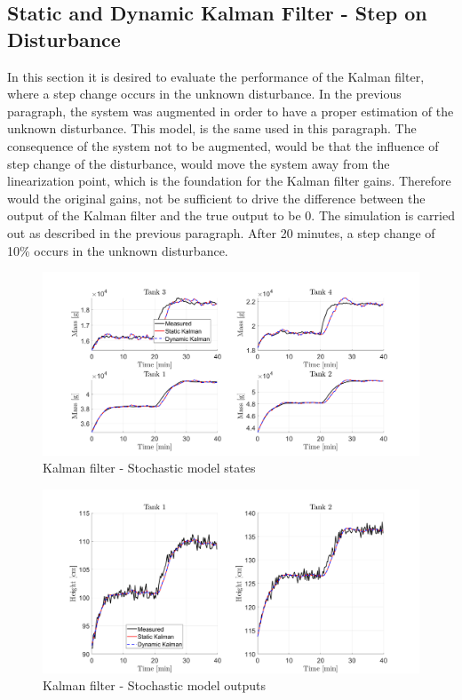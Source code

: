 \subsection{Static and Dynamic Kalman Filter - Step on Disturbance}
In this section it is desired to evaluate the performance of the Kalman filter, where a step change occurs in the unknown disturbance. In the previous paragraph, the system was augmented in order to have a proper estimation of the unknown disturbance. This model, is the same used in this paragraph. The consequence of the system not to be augmented, would be that the influence of step change of the disturbance, would move the system away from the linearization point, which is the foundation for the Kalman filter gains. Therefore would the original gains, not be sufficient to drive the difference between the output of the Kalman filter and the true output to be 0. The simulation is carried out as described in the previous paragraph. After 20 minutes, a step change of 10\% occurs in the unknown disturbance.
\begin{figure}[H]
    \centering
    \includegraphics[width=1\textwidth]{Figures/Pr5.3_stoc_states.png}
    \caption{Kalman filter - Stochastic model states}
\end{figure}
\begin{figure}[H]
    \centering
    \includegraphics[width=1\textwidth]{Figures/Pr5.3_stoc_output.png}
    \caption{Kalman filter - Stochastic model outputs}
\end{figure}
